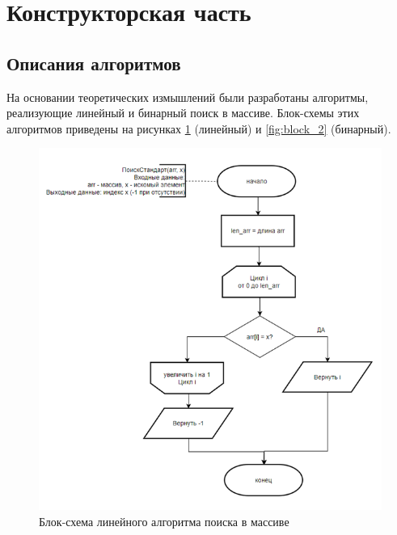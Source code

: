 \section{Конструкторская часть}
\subsection{Описания алгоритмов}

\hspace{1.25cm}
На основании теоретических измышлений были разработаны алгоритмы, реализующие линейный и бинарный поиск в массиве. Блок-схемы этих алгоритмов приведены на рисунках \ref{fig:block_1} (линейный) и \ref{fig:block_2} (бинарный).

\begin{figure}[H]
    \centering
    \includegraphics[width=1\textwidth]{img/block_1.png}
    \caption{Блок-схема линейного алгоритма поиска в массиве}
    \label{fig:block_1}
\end{figure}


